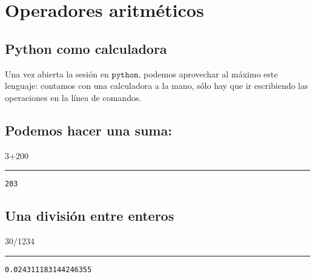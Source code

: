 \documentclass[]{article}
\date{}
\newenvironment{Shaded}{}{}
\newcommand{\DecValTok}[1]{\textcolor[rgb]{0.25,0.63,0.44}{#1}}
\newcommand{\OperatorTok}[1]{\textcolor[rgb]{0.40,0.40,0.40}{#1}}
\begin{document}
\section{Operadores aritméticos}\label{operadores-aritmuxe9ticos}

\subsection{Python como calculadora}\label{python-como-calculadora}

Una vez abierta la sesión en \(\texttt{python}\), podemos aprovechar al
máximo este lenguaje: contamos con una calculadora a la mano, sólo hay
que ir escribiendo las operaciones en la línea de comandos.

\subsection{Podemos hacer una suma:}\label{podemos-hacer-una-suma}

\begin{Shaded}
\begin{Highlighting}[]
\DecValTok{3}\OperatorTok{+}\DecValTok{200}
\end{Highlighting}
\end{Shaded}

\begin{center}\rule{0.5\linewidth}{\linethickness}\end{center}

\begin{verbatim}
203
\end{verbatim}

\subsection{Una división entre
enteros}\label{una-divisiuxf3n-entre-enteros}

\begin{Shaded}
\begin{Highlighting}[]
\DecValTok{30}\OperatorTok{/}\DecValTok{1234}
\end{Highlighting}
\end{Shaded}

\begin{center}\rule{0.5\linewidth}{\linethickness}\end{center}

\begin{verbatim}
0.024311183144246355
\end{verbatim}
\end{document}
